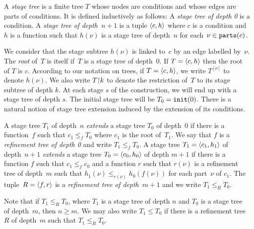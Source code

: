\begin{definition}
A \emph{stage tree} is a finite tree $T$ whose nodes are conditions 
and whose edges are parts of conditions. It is defined inductively as follows:
A \emph{stage tree of depth 0} is a condition. 
A \emph{stage tree of depth~$n+1$} is a tuple $\left\langle c, h \right\rangle$ where
$c$ is a condition and $h$ is a function such that $h(\nu)$ is a stage tree of depth~$n$ for each~$\nu \in \mathtt{parts}(c)$.
\end{definition}

We consider that the stage subtree $h(\nu)$ is linked to~$c$ by an edge labelled by~$\nu$.
The \emph{root} of~$T$ is itself if~$T$ is a stage tree of depth~0. If $T = \left\langle c,h \right\rangle$
then the root of $T$ is $c$.
According to our notation on trees, if $T = \left\langle c, h \right\rangle$,
we write $T^{[\nu]}$ to denote $h(\nu)$.
We also write $T {\upharpoonright} k$ to denote the restriction of~$T$ to its stage subtree of depth $k$.
At each stage $s$ of the construction, we will end up with a stage tree of depth $s$.
The initial stage tree will be $T_0 = \mathtt{init}(0)$. There is a natural notion
of stage tree extension induced by the extension of its conditions.

\begin{definition}
A stage tree $T_1$ of depth~$n$ \emph{extends} a stage tree $T_0$ of depth~$0$
if there is a function~$f$ such that $c_1 \leq_f T_0$ where $c_1$ is the root of~$T_1$.
We say that $f$ is a \emph{refinement tree of depth 0} and write $T_1 \leq_f T_0$.
A stage tree $T_1 = \left\langle c_1, h_1 \right\rangle$ of depth~$n+1$ \emph{extends} a stage tree $T_0 = \left\langle c_0, h_0 \right\rangle$
of depth $m+1$ if there is a function $f$ such that $c_1 \leq_f c_0$ and a function $r$ such that
$r(\nu)$ is a refinement tree of depth~$m$
such that $h_1(\nu) \leq_{r(\nu)} h_0(f(\nu))$ for each part~$\nu$ of $c_1$.
The tuple~$R = \left\langle f, r \right\rangle$ is a \emph{refinement tree of depth~$m+1$}
and we write $T_1 \leq_R T_0$.
\end{definition}

Note that if $T_1 \leq_R T_0$, where $T_1$ is a stage tree of depth $n$
and $T_0$ is a stage tree of depth~$m$, then $n \geq m$.
We may also write $T_1 \leq T_0$ if there is a refinement tree~$R$ of depth~$m$
such that $T_1 \leq_R T_0$.

